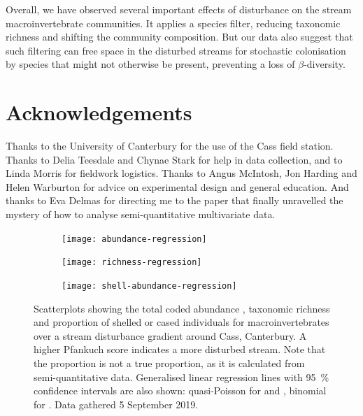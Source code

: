 \documentclass[a4paper,10pt]{article}
\newcommand\datadate{5 September 2019} %
\begin{document}
Overall, we have observed several important effects of disturbance on the stream macroinvertebrate communities.
It applies a species filter, reducing taxonomic richness and shifting the community composition.
But our data also suggest that such filtering can free space in the disturbed streams for stochastic colonisation by species that might not otherwise be present, preventing a loss of $\beta$-diversity.

\section*{Acknowledgements}

Thanks to the University of Canterbury for the use of the Cass field station.
Thanks to Delia Teesdale and Chynae Stark for help in data collection, and to Linda Morris for fieldwork logistics.
Thanks to Angus McIntosh, Jon Harding and Helen Warburton for advice on experimental design and general education.
And thanks to Eva Delmas for directing me to the paper that finally unravelled the mystery of how to analyse semi-quantitative multivariate data.

\FloatBarrier
\printbibliography

\clearpage

\begin{figure}[p]
	\centering
	\begin{subfigure}[t]{\textwidth}
		\centering
		\texttt{[image: abundance-regression]}
		\caption{}\label{fig:abundance-regression}
	\end{subfigure}
	\begin{subfigure}[t]{\textwidth}
		\centering
		\texttt{[image: richness-regression]}
		\caption{}\label{fig:richness-regression}
	\end{subfigure}
	\begin{subfigure}[t]{\textwidth}
		\centering
		\texttt{[image: shell-abundance-regression]}
		\caption{}\label{fig:shell-abundance-regression}
	\end{subfigure}
	\caption[Regression plots]{ %
		Scatterplots showing the total coded abundance , taxonomic richness  and proportion of shelled or cased individuals  for macroinvertebrates over a stream disturbance gradient around Cass, Canterbury.
		A higher Pfankuch score indicates a more disturbed stream.
		Note that the proportion is not a true proportion, as it is calculated from semi-quantitative data.
		Generalised linear regression lines with \SI{95}{\percent} confidence intervals are also shown: quasi-Poisson for  and , binomial for .
		Data gathered {\datadate}.
	}\label{fig:regressions}
\end{figure}
\end{document}
